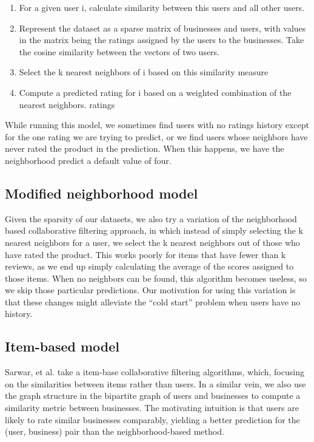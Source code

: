 \documentclass[letterpaper, 11 pt, conference]{ieeeconf}
\begin{document}
\begin{enumerate}
  \item For a given user i, calculate similarity between this users and all
    other users. 
  \item Represent the dataset as a sparse matrix of businesses and users, with
    values in the matrix being the ratings assigned by the users to the
    businesses. Take the cosine similarity between the vectors of two users.
  \item Select the k nearest neighbors of i based on this similarity measure
  \item Compute a predicted rating for i based on a weighted combination of the
    nearest neighbors. ratings
\end{enumerate}

While running this model, we sometimes find users with no ratings history 
except for the one rating we are trying to predict, or we find users whose 
neighbors have never rated the product in the prediction. When this happens, we 
have the neighborhood predict a default value of four.

\subsection{Modified neighborhood model}

Given the sparsity of our datasets, we also try a variation of the
neighborhood based collaborative filtering approach, in which instead of
simply selecting the k nearest neighbors for a user, we select the k
nearest neighbors out of those who have rated the product. This works
poorly for items that have fewer than k reviews, as we end up simply
calculating the average of the scores assigned to those items. When no 
neighbors can be found, this algorithm becomes useless, so we skip those 
particular predictions. Our motivation for using this variation is that 
these changes might alleviate the ``cold start'' problem when users have no 
history.

\subsection{Item-based model}

Sarwar, et al.\cite{bib:sarwar} take a item-base collaborative filtering algorithms,
 which, focusing on the similarities between items rather than
users. In a similar vein, we also use the graph structure in the bipartite
graph of users and businesses to compute a similarity metric between
businesses. The motivating intuition is that users are likely to rate
similar businesses comparably, yielding a better prediction for the (user,
business) pair than the neighborhood-based method.
\end{document}
